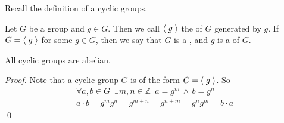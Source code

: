 Recall the definition of a cyclic groups.

\begin{defn*}
  Let $G$ be a group and $g \in G$. Then we call $\langle \; g \; \rangle$ the  of $G$ generated by $g$. If $G = \langle \; g \; \rangle$ for some $g \in G$, then we say that $G$ is a , and $g$ is a  of $G$.
\end{defn*}

\begin{propo}
\label{propo:cyclic_groups_are_abelian}
  All cyclic groups are abelian.
\end{propo}

\begin{proof}
  Note that a cyclic group $G$ is of the form $G = \langle \; g \; \rangle$. So
  \begin{gather*}
    \forall a, b \in G \enspace \exists m, n \in \mathbb{Z} \enspace a = g^m \, \land \, b = g^n \\
    a \cdot b = g^m g^n = g^{m + n} = g^{n + m} = g^n g^m = b \cdot a
  \end{gather*}\qed
\end{proof}




